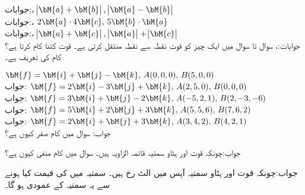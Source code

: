 جوابات:، 
\quad
$\abs{\bM{a}+\bM{b}},\, \abs{\bM{a}-\bM{b}}$\\

جوابات:، 
\quad
$2\bM{a}\cdot 4\bM{c},\, 5\bM{b}\cdot \bM{a}$\\

جوابات:، 
\quad
$\abs{\bM{a}+\bM{c}},\, \abs{\bM{a}}+\abs{\bM{c}}$\\

جوابات:، 
سوال  تا سوال  میں ایک چیز کو قوت  نقطہ  سے نقطہ  منتقل کرتی ہے۔ قوت کتنا کام کرتا ہے؟ کام کی تعریف  ہے۔

\quad 
$\bM{f}=\bM{i}+\bM{j}-\bM{k},\, A(0,0,0),\, B(5,0,0)$\\
جواب:
\quad 
$\bM{f}=2\bM{i}-3\bM{j}+\bM{k},\, A(2,5,0),\, B(0,0,0)$\\
جواب:
\quad 
$\bM{f}=3\bM{i}+\bM{j}-2\bM{k},\, A(-5,2,1),\, B(2,-3,-6)$\\
جواب:
\quad 
$\bM{f}=5\bM{i}+2\bM{j}+3\bM{k},\, A(5,5,6),\, B(7,6,2)$\\
جواب:
\quad 
$\bM{f}=2\bM{i}+\bM{j}+3\bM{k},\, A(3,4,2),\, B(4,2,1)$\\
جواب:
سوال  میں کام صفر کیوں ہے؟

جواب:چونکہ قوت اور ہٹاو سمتیہ قائمہ الزاویہ ہیں۔
سوال  میں کام منفی کیوں ہے؟

جواب:چونکہ قوت اور ہٹاو سمتیہ آپس میں الٹ رخ ہیں۔
سمتیہ  میں  کی قیمت کیا ہونے سے یہ  سمتیہ  کے عمودی ہو گا۔

